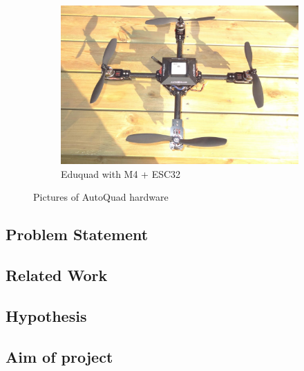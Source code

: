 \begin{figure}[H]
    \begin{subfigure}[b]{0.3\textwidth}
        \includegraphics[width=\textwidth]{graphics/eduquad.jpg}
        \caption{Eduquad with M4 + ESC32}
        \label{fig:mouse}
    \end{subfigure}
    \caption{Pictures of AutoQuad hardware}\label{fig:AQ_hw}
\end{figure} 



\newpage
\subsection{Problem Statement}

\subsection{Related Work}

\subsection{Hypothesis}

\subsection{Aim of project}
